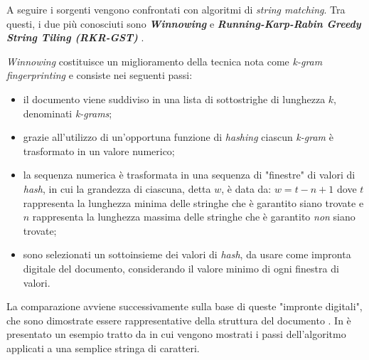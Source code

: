A seguire i sorgenti vengono confrontati con algoritmi di \textit{string matching}.
%
Tra questi, i due più conosciuti sono \textbf{\textit{Winnowing}} \cite{winnowing} e \textbf{\textit{Running-Karp-Rabin Greedy String Tiling (RKR-GST)}} \cite{wise-running-93}.

\textit{Winnowing} costituisce un miglioramento della tecnica nota come \textit{k-gram fingerprinting} e consiste nei seguenti passi:
\begin{itemize}
    \item il documento viene suddiviso in una lista di sottostrighe di lunghezza $k$, denominati \textit{k-grams};

    \item grazie all'utilizzo di un'opportuna funzione di \textit{hashing} ciascun \textit{k-gram} è trasformato in un valore numerico;
    
    \item la sequenza numerica è trasformata in una sequenza di "finestre" di valori di \textit{hash}, in cui la grandezza di ciascuna, detta $w$, è data da: $w = t - n + 1$ dove $t$ rappresenta la lunghezza minima delle stringhe che è garantito siano trovate e $n$ rappresenta la lunghezza massima delle stringhe che è garantito \textit{non} siano trovate;
    
    \item sono selezionati un sottoinsieme dei valori di \textit{hash}, da usare come impronta digitale del documento, considerando il valore minimo di ogni finestra di valori.
\end{itemize}

La comparazione avviene successivamente sulla base di queste "impronte digitali", che sono dimostrate essere rappresentative della struttura del documento \cite{winnowing}.
%
In  è presentato un esempio tratto da \cite{winnowing} in cui vengono mostrati i passi dell'algoritmo applicati a una semplice stringa di caratteri.

